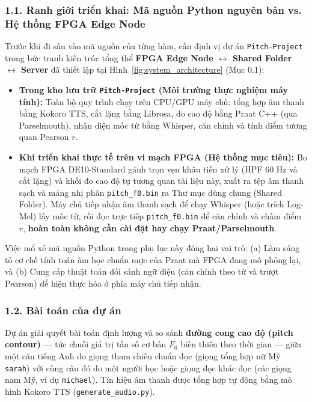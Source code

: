 \documentclass[11pt,a4paper]{article}
\begin{document}
\subsubsection*{1.1. Ranh giới triển khai: Mã nguồn Python nguyên bản vs. Hệ thống FPGA Edge Node}
Trước khi đi sâu vào mã nguồn của từng hàm, cần định vị dự án \texttt{Pitch-Project} trong bức tranh kiến trúc tổng thể \textbf{FPGA Edge Node $\leftrightarrow$ Shared Folder $\leftrightarrow$ Server} đã thiết lập tại Hình~\ref{fig:system_architecture} (Mục 0.1):
\begin{itemize}
    \setlength{\itemsep}{1pt}
    \item \textbf{Trong kho lưu trữ \texttt{Pitch-Project} (Môi trường thực nghiệm máy tính):} Toàn bộ quy trình chạy trên CPU/GPU máy chủ: tổng hợp âm thanh bằng Kokoro TTS, cắt lặng bằng Librosa, đo cao độ bằng Praat C++ (qua Parselmouth), nhận diện mốc từ bằng Whisper, căn chỉnh và tính điểm tương quan Pearson $r$.
    \item \textbf{Khi triển khai thực tế trên vi mạch FPGA (Hệ thống mục tiêu):} Bo mạch FPGA DE10-Standard gánh trọn vẹn khâu tiền xử lý (HPF 60 Hz và cắt lặng) và khối đo cao độ tự tương quan tài liệu này, xuất ra tệp âm thanh sạch và mảng nhị phân \texttt{pitch\_f0.bin} ra Thư mục dùng chung (Shared Folder). Máy chủ tiếp nhận âm thanh sạch để chạy Whisper (hoặc trích Log-Mel) lấy mốc từ, rồi đọc trực tiếp \texttt{pitch\_f0.bin} để căn chỉnh và chấm điểm $r$, \textbf{hoàn toàn không cần cài đặt hay chạy Praat/Parselmouth}.
\end{itemize}
Việc mổ xẻ mã nguồn Python trong phụ lục này đóng hai vai trò: (a) Làm sáng tỏ cơ chế tính toán âm học chuẩn mực của Praat mà FPGA đang mô phỏng lại, và (b) Cung cấp thuật toán đối sánh ngữ điệu (căn chỉnh theo từ và trượt Pearson) để hiện thực hóa ở phía máy chủ tiếp nhận.

\subsubsection*{1.2. Bài toán của dự án}
Dự án giải quyết bài toán định lượng và so sánh \textbf{đường cong cao độ (pitch contour)} --- tức chuỗi giá trị tần số cơ bản $F_0$ biến thiên theo thời gian --- giữa một câu tiếng Anh do giọng tham chiếu chuẩn đọc (giọng tổng hợp nữ Mỹ \texttt{sarah}) với cùng câu đó do một người học hoặc giọng đọc khác đọc (các giọng nam Mỹ, ví dụ \texttt{michael}). Tín hiệu âm thanh được tổng hợp tự động bằng mô hình Kokoro TTS (\texttt{generate\_audio.py}). 
\end{document}
